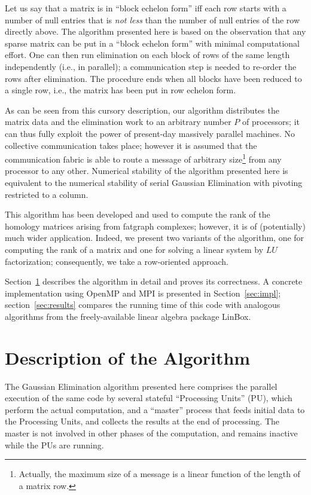 Let us say that a matrix is in ``block echelon form'' iff each row
starts with a number of null entries that is \emph{not less} than the
number of null entries of the row directly above.
The algorithm presented here is based on the observation that any
sparse matrix can be put in a ``block echelon form'' with minimal
computational effort.  One can then run elimination on each block of
rows of the same length independently (i.e., in parallel); a
communication step is needed to re-order the rows after elimination. 
The procedure ends when all blocks have been reduced to a single row,
i.e., the matrix has been put in row echelon form.

As can be seen from this cursory description, our algorithm
distributes the matrix data and the elimination work to an arbitrary
number $P$ of processors; it can thus fully exploit the power of
present-day massively parallel
machines.  No collective communication takes place; however it is
assumed that the communication fabric is able to route a message of
arbitrary size\footnote{Actually, the maximum size of a message is a
  linear function of the length of a matrix row.} from any processor
to any other.  Numerical stability of the algorithm presented here is
equivalent to the numerical stability of serial Gaussian Elimination
with pivoting restricted to a column.

This algorithm has been developed and used to compute the rank of the
homology matrices arising from fatgraph complexes; however, it is of
(potentially) much wider application.  Indeed, we present two variants
of the algorithm, one for computing the rank of a matrix and one for
solving a linear system by $LU$ factorization; consequently, we take a
row-oriented approach.

Section~\ref{sec:algo} describes the algorithm in detail and proves
its correctness.  A concrete implementation using
OpenMP and MPI is presented in Section~\ref{sec:impl};
section~\ref{sec:results} compares the running time of this code with
analogous algorithms from the freely-available linear algebra package
LinBox.


\section{Description of the Algorithm}
\label{sec:algo}

The Gaussian Elimination algorithm presented here comprises the
parallel execution of the same code by several stateful ``Processing
Units'' (PU), which perform the actual computation, and a
``master'' process that feeds initial data to the Processing Units,
and collects the results at the end of processing.  The master is not
involved in other phases of the computation, and remains inactive
while the PUs are running.

